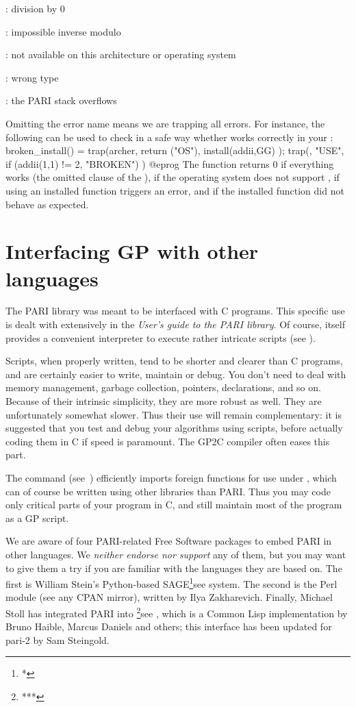 : division by 0

: impossible inverse modulo

: not available on this architecture or operating system

: wrong type

: the PARI stack overflows

\noindent Omitting the error name means we are trapping all errors. For
instance, the following can be used to check in a safe way whether
 works correctly in your :
\bprog
broken_install() =
{
  trap(archer, return ("OS"),
    install(addii,GG)
  );
  trap(, "USE",
    if (addii(1,1) != 2, "BROKEN")
  )
}
@eprog
\noindent The function returns 0 if everything works (the omitted 
clause of the ),  if the operating system does not support
,  if using an installed function triggers an error,
and  if the installed function did not behave as expected.

\section{Interfacing GP with other languages}
\noindent
The PARI library was meant to be interfaced with C programs. This specific
use is dealt with extensively in the \emph{User's guide to the PARI library}.
Of course,  itself provides a convenient  interpreter to execute
rather intricate scripts (see ).

Scripts, when properly written, tend to be shorter and clearer than C
programs, and are certainly easier to write, maintain or debug. You don't
need to deal with memory management, garbage collection, pointers,
declarations, and so on. Because of their intrinsic simplicity, they are more
robust as well. They are unfortunately somewhat slower. Thus their use will
remain complementary: it is suggested that you test and debug your algorithms
using scripts, before actually coding them in C if speed is paramount.
The GP2C compiler often eases this part.

The  command (see~) efficiently imports
foreign functions for use under , which can of course be written
using other libraries than PARI. Thus you may code only critical parts
of your program in C, and still maintain most of the program as a GP script.

We are aware of four PARI-related Free Software packages to embed PARI in
other languages. We \emph{neither endorse nor support} any of them, but you
may want to give them a try if you are familiar with the languages they are
based on. The first is William Stein's Python-based SAGE\footnote{*}{see
} system. The second is the  Perl
module (see any CPAN mirror), written by Ilya Zakharevich.
Finally, Michael Stoll has integrated PARI into \footnote{***}{see
}, which is a Common Lisp implementation by Bruno
Haible, Marcus Daniels and others; this interface has been updated for pari-2
by Sam Steingold.

